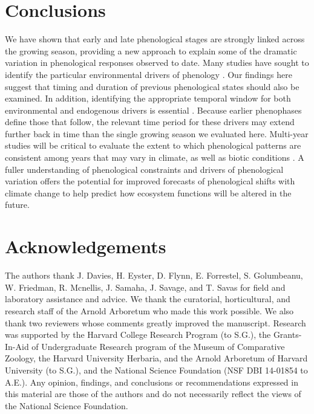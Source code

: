 \documentclass{article}
\begin{document}
\section* {Conclusions}
We have shown that early and late phenological stages are strongly linked across the growing season, providing a new approach to explain some of the dramatic variation in phenological responses observed to date. Many studies have sought to identify the particular environmental drivers of phenology \citep [e.g.,][]{morin2010,schwartz2013}. Our findings here suggest that timing and duration of previous phenological states should also be examined. In addition, identifying the appropriate temporal window for both environmental and endogenous drivers is essential \citep{teller2016}. Because earlier phenophases define those that follow, the relevant time period for these drivers may extend further back in time than the single growing season we evaluated here. Multi-year studies will be critical to evaluate the extent to which phenological patterns are consistent among years that may vary in climate, as well as biotic conditions \citep [i.e., pollinator or pest populations,][]{lechowicz1995}. %
A fuller understanding of phenological constraints and drivers of phenological variation offers the potential for improved forecasts of phenological shifts with climate change to help predict how ecosystem functions will be altered in the future. 

\section*{Acknowledgements}
The authors thank J. Davies, H. Eyster, D. Flynn, E. Forrestel, S. Golumbeanu, W. Friedman, R. Mcnellis, J. Samaha, J. Savage, and T. Savas for field and laboratory assistance and advice. We thank the curatorial, horticultural, and research staff of the Arnold Arboretum who made this work possible. We also thank two reviewers whose comments greatly improved the manuscript.  Research was supported by the Harvard College Research Program (to S.G.), the Grants-In-Aid of Undergraduate Research program of the Museum of Comparative Zoology, the Harvard University Herbaria, and the Arnold Arboretum of Harvard University (to S.G.), and the National Science Foundation (NSF DBI 14-01854 to A.E.). Any opinion, findings, and conclusions or recommendations expressed in this material are those of the authors and do not necessarily reflect the views of the National Science Foundation.
\end{document}

